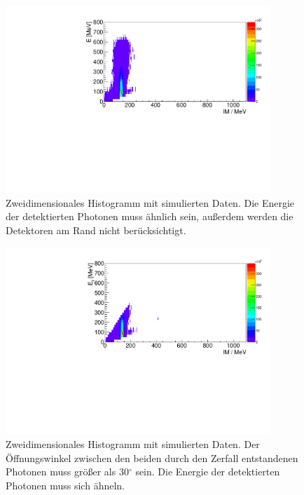 \documentclass[a4paper,11pt,oneside,final,german,openbib,pdftex]{scrbook}
\begin{document}
{\begin{appendix}
\begin{figure}[h!]
	\begin{center}
		\includegraphics[width=100mm]{NewCalib/20171904Sim30DegreeCut}
		\caption[Simulation: 2D-Hist; Ohne Detektoren am Rand]{Zweidimensionales Histogramm mit simulierten Daten. Die Energie der detektierten Photonen muss \"ahnlich sein, au{\ss}erdem werden die Detektoren am Rand nicht ber\"ucksichtigt.}
		\label{fig:Sim-Data-2DHist-30-Degree-Edge}
	\end{center}
\end{figure}




\begin{figure}[h!]
	\begin{center}
		\includegraphics[width=100mm]{20170505MinOpeningAngle2DHist}
		\caption[Simulation: 2D-Hist \"Offnungswinkel muss gr\"o{\ss}er als 30$^{\circ}$ sein.]{Zweidimensionales Histogramm mit simulierten Daten. Der \"Offnungswinkel zwischen den beiden durch den Zerfall entstandenen Photonen muss gr\"o{\ss}er als 30$^{\circ}$ sein. Die Energie der detektierten Photonen muss sich \"ahneln.}
		\label{fig;2D-Hist-Min-OpeningAngle}
	\end{center}
\end{figure}







\end{appendix}}
\end{document}
